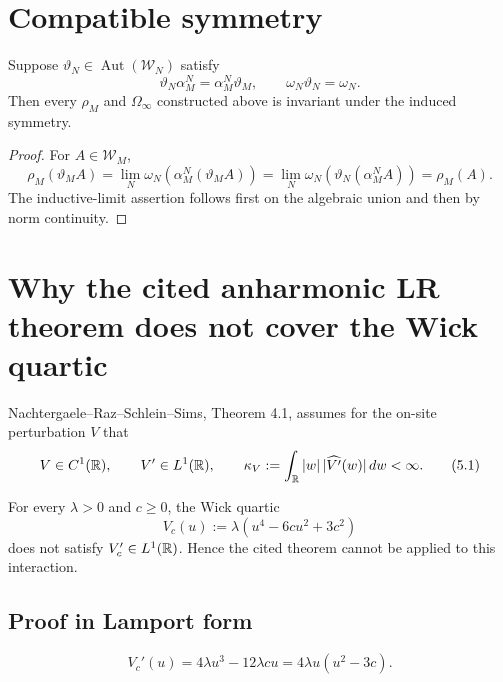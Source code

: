 \documentclass[11pt,a4paper]{article}
\newcommand{\W}{\mathcal W}
\newcommand{\dd}{\,d}
\begin{document}
\section{Compatible symmetry}

\begin{proposition}
Suppose \(\vartheta_N\in\operatorname{Aut}(\W_N)\) satisfy
\[
 \vartheta_N\alpha_M^N=\alpha_M^N\vartheta_M,\qquad
 \omega_N\vartheta_N=\omega_N.                                \tag{4.1}
\]
Then every \(\rho_M\) and \(\Omega_\infty\) constructed above is invariant under
the induced symmetry.
\end{proposition}

\begin{proof}
For \(A\in\W_M\),
\[
 \rho_M(\vartheta_MA)
 =\lim_N\omega_N(\alpha_M^N(\vartheta_MA))
 =\lim_N\omega_N(\vartheta_N(\alpha_M^N A))
 =\rho_M(A).                                                    \tag{4.2}
\]
The inductive-limit assertion follows first on the algebraic union and then by norm
continuity.
\end{proof}

\section{Why the cited anharmonic LR theorem does not cover the Wick quartic}

Nachtergaele--Raz--Schlein--Sims, Theorem 4.1, assumes for the on-site
perturbation \(V\) that
\[
 V\in C^1(\R),\qquad V'\in L^1(\R),\qquad
 \kappa_V:=\int_{\R}|w|\,|\widehat{V'}(w)|\dd w<\infty.         \tag{5.1}
\]

\begin{proposition}\label{prop:NRSSfail}
For every \(\lambda>0\) and \(c\ge0\), the Wick quartic
\[
 V_c(u):=\lambda(u^4-6cu^2+3c^2)                              \tag{5.2}
\]
does not satisfy \(V_c'\in L^1(\mathbb R)\).  Hence the cited theorem cannot be
applied to this interaction.
\end{proposition}

\subsection*{Proof in Lamport form}


\[
 V_c'(u)=4\lambda u^3-12\lambda cu
 =4\lambda u(u^2-3c).                                         \tag{5.3}
\]

\end{document}
